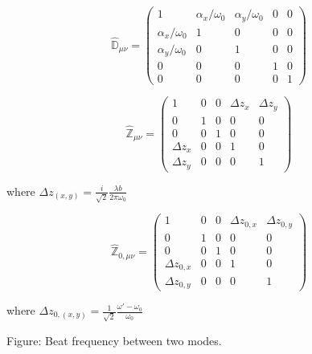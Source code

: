 		\begin{equation} \label{mistrans_matrix}
		\hat{\mathbb{D}}_{\mu \nu} = 
		\begin{pmatrix}
			1					&\alpha_x/\omega_{0}	&\alpha_y/\omega_{0}	& 0 & 0
		\\ \alpha_x/\omega_{0}	&1						&0						& 0 & 0
		\\ \alpha_y/\omega_{0}	&0						&1						& 0	& 0
		\\ 0					&0						&0						& 1	& 0
		\\ 0					&0						&0						& 0 & 1 
		\end{pmatrix}
		\end{equation}
		
		\begin{equation} \label{waistloc_matrix}
		\hat{\mathbb{Z}}_{\mu \nu} = 
		\begin{pmatrix}
		1				&0		&0		&\Delta z_x 	&\Delta z_y  
		\\ 0			&1		&0		&0 				&0
		\\ 0			&0		&1		&0 				&0
		\\ \Delta z_x	&0		&0		&1 				&0
		\\ \Delta z_y	&0		&0		&0				&1 
		\end{pmatrix}
		\end{equation}
		
		where $\Delta z_{(x,y)} =  \frac{i}{\sqrt{2}} \frac{\lambda b}{2\pi\omega_{0}} $
		
		\begin{equation} \label{waistsize_matrix}
		\hat{\mathbb{Z}}_{0, \mu \nu} = 
		\begin{pmatrix}
		1					&0		&0		&\Delta z_{0,x} 	&\Delta z_{0,y} 
		\\ 0				&1		&0		&0 					&0
		\\ 0				&0		&1		&0 					&0
		\\ \Delta z_{0,x} 	&0		&0		&1 					&0
		\\ \Delta z_{0,y} 	&0		&0		&0					&1 
		\end{pmatrix}
		\end{equation}

		where $\Delta z_{0,(x,y)} =   \frac{1}{\sqrt{2}} \frac{\omega'-\omega_{0}}{\omega_{0}} $

		Figure: Beat frequency between two modes.
	
	